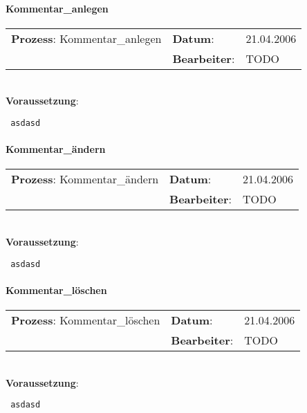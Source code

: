 \paragraph{Kommentar\_anlegen}
\begin{tabular}[t]{p{9.5cm}ll}
\textbf{Prozess}: Kommentar\_anlegen  	&\textbf{Datum}:      &21.04.2006\\
					&\textbf{Bearbeiter}: &TODO\\
\end{tabular}

\hrulefill\\
\textbf{Voraussetzung}:
\begin{verbatim}
 asdasd
\end{verbatim}
\hrulefill



\paragraph{Kommentar\_ändern}
\begin{tabular}[t]{p{9.5cm}ll}
\textbf{Prozess}: Kommentar\_ändern  	&\textbf{Datum}:      &21.04.2006\\
					&\textbf{Bearbeiter}: &TODO\\
\end{tabular}

\hrulefill\\
\textbf{Voraussetzung}:
\begin{verbatim}
 asdasd
\end{verbatim}
\hrulefill



\paragraph{Kommentar\_löschen}
\begin{tabular}[t]{p{9.5cm}ll}
\textbf{Prozess}: Kommentar\_löschen  	&\textbf{Datum}:      &21.04.2006\\
					&\textbf{Bearbeiter}: &TODO\\
\end{tabular}

\hrulefill\\
\textbf{Voraussetzung}:
\begin{verbatim}
 asdasd
\end{verbatim}
\hrulefill